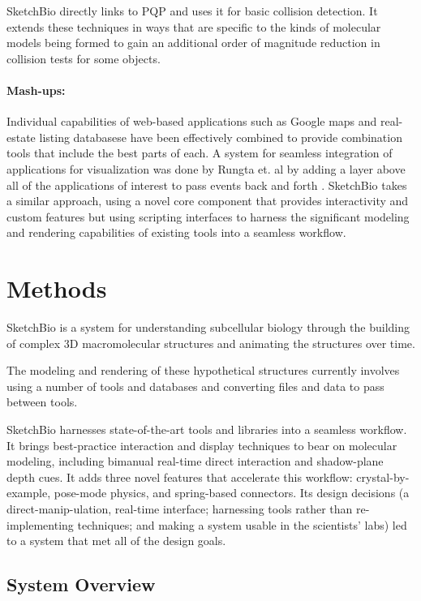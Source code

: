 \documentclass[twocolumn]{bmcart}%
\begin{document}
SketchBio directly links to PQP and uses it for basic collision detection.
It extends these techniques in ways that are specific to the kinds of molecular models being formed to gain an additional order of magnitude reduction in collision tests for some objects.

\paragraph*{Mash-ups:}
Individual capabilities of web-based applications such as Google maps and real-estate listing databasese have been effectively combined to provide combination tools that include the best parts of each.
A system for seamless integration of applications for visualization was done by Rungta et. al by adding a layer above all of the applications of interest to pass events back and forth \cite{rungta2013manyvis}.
SketchBio takes a similar approach, using a novel core component that provides interactivity and custom features but using scripting interfaces to harness the significant modeling and rendering capabilities of existing tools into a seamless workflow.

\section*{Methods}

SketchBio is a system for understanding subcellular biology through the building of complex 3D macromolecular structures and animating the structures over time.

The modeling and rendering of these hypothetical structures currently involves using a number of tools and databases and converting files and data to pass between tools.

SketchBio harnesses state-of-the-art tools and libraries into a seamless workflow.
It brings best-practice interaction and display techniques to bear on molecular modeling, including bimanual real-time direct interaction and shadow-plane depth cues.
It adds three novel features that accelerate this workflow: crystal-by-example, pose-mode physics, and spring-based connectors.
Its design decisions (a direct-manip-ulation, real-time interface; harnessing tools rather than re-implementing techniques; and making a system usable in the scientists' labs) led to a system that met all of the design goals.

\subsection*{System Overview}
\end{document}
